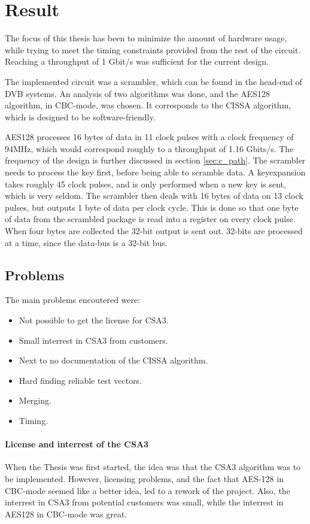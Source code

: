 \chapter{Result}
The focus of this thesis has been to minimize the amount of hardware 
usage, while trying to meet the timing constraints provided 
from the rest of the circuit. Reaching a throughput of 1 Gbit/s was 
sufficient for the current design.

The implemented circuit was a scrambler, which can be found in the 
head-end of DVB systems. An analysis of two algorithms was done, and 
the AES128 algorithm, in CBC-mode, was chosen. It corresponds to the 
CISSA algorithm, which is designed to be software-friendly. 

AES128 processes 16 bytes of data in 11 clock pulses with a clock 
frequency of 94MHz, which would correspond roughly to a throughput of 
1.16 Gbits/s. The frequency of the design is further discussed in 
section \ref{sec:c_path}. The scrambler needs to process the key 
first, before being able to scramble data. A keyexpansion takes 
roughly 45 clock pulses, and is only performed when a new key is sent, 
which is very seldom. The scrambler then deals with 16 bytes of data 
on 13 clock pulses, but outputs 1 byte of data per clock cycle. This 
is done so that one byte of data from the scrambled package is read 
into a register on every clock pulse. When four bytes are collected 
the 32-bit output is sent out. 32-bits are processed at a time, since 
the data-bus is a 32-bit bus.

\section{Problems}
The main problems encoutered were:

\begin{itemize}
\item Not possible to get the license for CSA3.
\item Small interrest in CSA3 from customers.
\item Next to no documentation of the CISSA algorithm.
\item Hard finding reliable test vectors.
\item Merging.
\item Timing.
\end{itemize}

\subsubsection{License and interrest of the CSA3}
When the Thesis was first started, the idea was that the CSA3 
algorithm was to be implemented. However, licensing problems, and the 
fact that AES-128 in CBC-mode seemed like a better idea, led to a 
rework of the project. Also, the interrest in CSA3 from potential 
customers was small, while the interrest in AES128 in CBC-mode was 
great.

